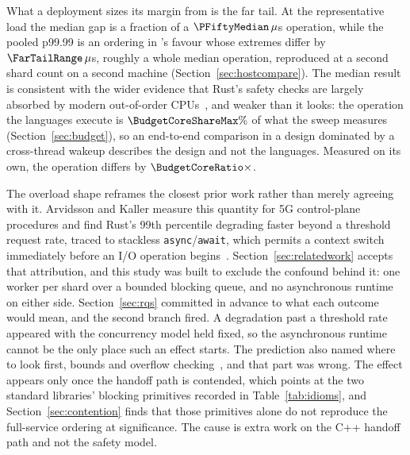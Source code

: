 What a deployment sizes its margin from is the far tail. At the representative load the median gap
is a fraction of a $\PFiftyMedian\,\mu$s operation, while the pooled p99.99 is an ordering in
\FarTailLower{}'s favour whose extremes differ by $\FarTailRange\,\mu$s, roughly a whole median
operation, reproduced at a second shard count on a second machine
(Section~\ref{sec:hostcompare}). The median result is consistent with the wider evidence that
Rust's safety checks are largely absorbed by modern out-of-order
CPUs~\cite{balasubramanian2017rust,emmerich2019drivers}, and weaker than it looks: the operation
the languages execute is $\BudgetCoreShareMax\%$ of what the sweep measures
(Section~\ref{sec:budget}), so an end-to-end comparison in a design dominated by a cross-thread
wakeup describes the design and not the languages. Measured on its own, the operation differs by
$\BudgetCoreRatio\times$.

The overload shape reframes the closest prior work rather than merely agreeing with it. Arvidsson
and Kaller measure this quantity for 5G control-plane procedures and find Rust's 99th percentile
degrading faster beyond a threshold request rate, traced to stackless
\texttt{async}/\texttt{await}, which permits a context switch immediately before an I/O operation
begins~\cite{arvidsson2025async}. Section~\ref{sec:relatedwork} accepts that attribution, and this
study was built to exclude the confound behind it: one worker per shard over a bounded blocking
queue, and no asynchronous runtime on either side. Section~\ref{sec:rqs} committed in advance to
what each outcome would mean, and the second branch fired. A degradation past a threshold rate
appeared with the concurrency model held fixed, so the asynchronous runtime cannot be the only
place such an effect starts. The prediction also named where to look first, bounds and overflow
checking~\cite{zhang2022runtime,harris2023morello}, and that part was wrong. The effect appears
only once the handoff path is contended, which points at the two standard libraries' blocking
primitives recorded in Table~\ref{tab:idioms}, and Section~\ref{sec:contention} finds that those
primitives alone do not reproduce the full-service ordering at significance. The cause is extra
work on the C++ handoff path and not the safety model.


